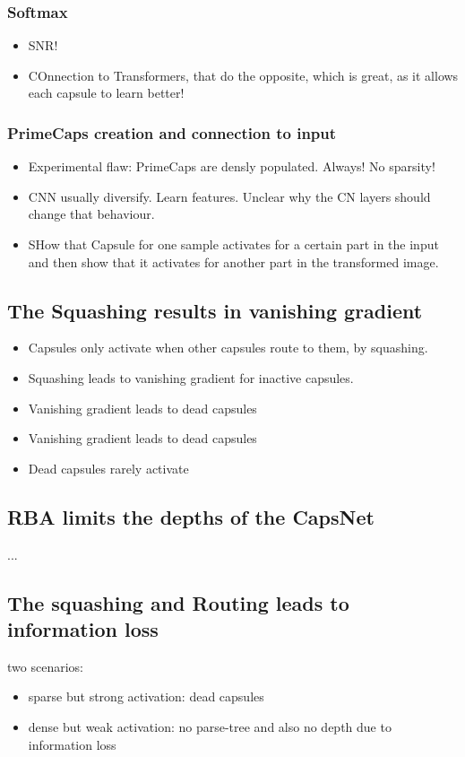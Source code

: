 \documentclass{article}
\begin{document}
\subsubsection*{Softmax}

\begin{itemize}
	\item SNR!
	\item COnnection to Transformers, that do the opposite, which is great, as it allows each capsule to learn better!
\end{itemize}

\subsubsection*{PrimeCaps creation and connection to input}
\begin{itemize}
	\item Experimental flaw: PrimeCaps are densly populated. Always! No sparsity!
	\item CNN usually diversify. Learn features. Unclear why the CN layers should change that behaviour.
	\item SHow that Capsule for one sample activates for a certain part in the input and then show that it activates for another part in the transformed image.
\end{itemize}

\subsection*{The Squashing results in vanishing gradient}
\begin{itemize}
	\item Capsules only activate when other capsules route to them, by squashing.
	\item Squashing leads to vanishing gradient for inactive capsules.
	\item Vanishing gradient leads to dead capsules
	\item Vanishing gradient leads to dead capsules
	\item Dead capsules rarely activate
\end{itemize}

\subsection*{RBA limits the depths of the CapsNet}
...

\subsection*{The squashing and Routing leads to information loss}
two scenarios:
\begin{itemize}
	\item sparse but strong activation: dead capsules
	\item dense but weak activation: no parse-tree and also no depth due to information loss
\end{itemize}
\end{document}
